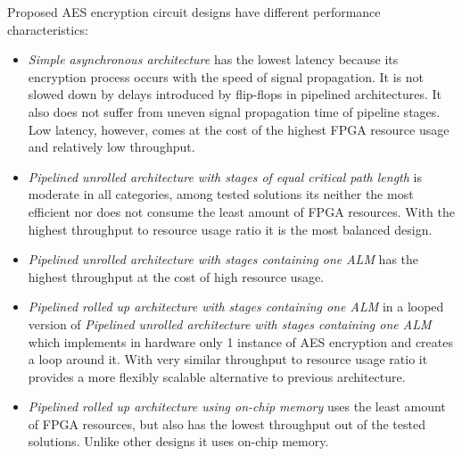 Proposed AES encryption circuit designs have different performance characteristics:
\begin{itemize}

\item \textit{Simple asynchronous architecture} has the lowest latency because its encryption process occurs with the speed of signal propagation. It is not slowed down by delays introduced by flip-flops in pipelined architectures. It also does not suffer from uneven signal propagation time of pipeline stages. Low latency, however, comes at the cost of the highest FPGA resource usage and relatively low throughput.

\item \textit{Pipelined unrolled architecture with stages of equal critical path length} is moderate in all categories, among tested solutions its neither the most efficient nor does not consume the least amount of FPGA resources. With the highest throughput to resource usage ratio it is the most balanced design.

\item \textit{Pipelined unrolled architecture with stages containing one ALM} has the highest throughput at the cost of high resource usage.

\item \textit{Pipelined rolled up architecture with stages containing one ALM} in a looped version of \textit{Pipelined unrolled architecture with stages containing one ALM} which implements in hardware only 1 instance of AES encryption and creates a loop around it. With very similar throughput to resource usage ratio it provides a more flexibly scalable alternative to previous architecture.

\item \textit{Pipelined rolled up architecture using on-chip memory} uses the least amount of FPGA resources, but also has the lowest throughput out of the tested solutions. Unlike other designs it uses on-chip memory.

\end{itemize}
